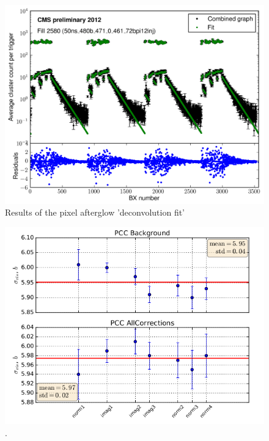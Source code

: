 \begin{figure}[H]
  \centering
  \includegraphics[width=0.5\columnwidth]{./afterglow.png}
  \caption{Results of the pixel afterglow 'deconvolution fit'}
  \label{fig:LHC}
\end{figure}


\begin{figure}[H]
  \centering
  \includegraphics[width=0.6\columnwidth]{./PCC_background.png}
  \caption{ \onehalfspacing \cite{}.}
  \label{fig:CMS}
\end{figure}
